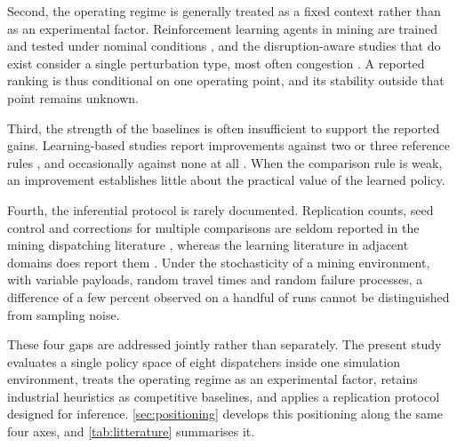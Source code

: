 \documentclass[11pt,a4paper]{article}
\begin{document}
Second, the operating regime is generally treated as a fixed context rather than as an experimental factor. Reinforcement learning agents in mining are trained and tested under nominal conditions \cite{deCarvalho2023, Hazrathosseini2024, Zhao2025}, and the disruption-aware studies that do exist consider a single perturbation type, most often congestion \cite{Zeng2022}. A reported ranking is thus conditional on one operating point, and its stability outside that point remains unknown.

Third, the strength of the baselines is often insufficient to support the reported gains. Learning-based studies report improvements against two or three reference rules \cite{Zhao2025}, and occasionally against none at all \cite{deCarvalho2023}. When the comparison rule is weak, an improvement establishes little about the practical value of the learned policy.

Fourth, the inferential protocol is rarely documented. Replication counts, seed control and corrections for multiple comparisons are seldom reported in the mining dispatching literature \cite{MehrnazMohtasham2023, MiladAbolghasemian2020, BurakOzdemir2019}, whereas the learning literature in adjacent domains does report them \cite{MohammadrezaNazari2018, CongZhang2020}. Under the stochasticity of a mining environment, with variable payloads, random travel times and random failure processes, a difference of a few percent observed on a handful of runs cannot be distinguished from sampling noise.

These four gaps are addressed jointly rather than separately. The present study evaluates a single policy space of eight dispatchers inside one simulation environment, treats the operating regime as an experimental factor, retains industrial heuristics as competitive baselines, and applies a replication protocol designed for inference. \cref{sec:positioning} develops this positioning along the same four axes, and \cref{tab:litterature} summarises it.


\end{document}
